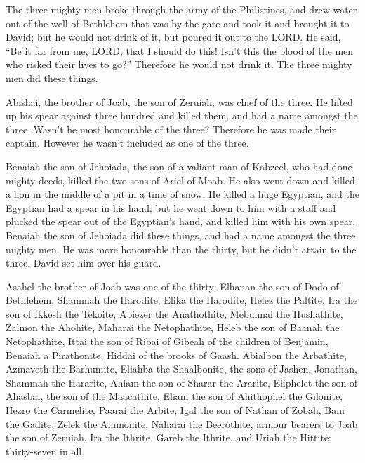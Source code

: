  The three mighty men broke through the army of the
Philistines, and drew water out of the well of Bethlehem that was by the
gate and took it and brought it to David; but he would not drink of it,
but poured it out to the LORD.  He said, ``Be it far from
me, LORD, that I should do this! Isn't this the blood of the men who
risked their lives to go?'' Therefore he would not drink it. The three
mighty men did these things.

 Abishai, the brother of Joab, the son of Zeruiah, was
chief of the three. He lifted up his spear against three hundred and
killed them, and had a name amongst the three.  Wasn't he
most honourable of the three? Therefore he was made their captain.
However he wasn't included as one of the three.

 Benaiah the son of Jehoiada, the son of a valiant man of
Kabzeel, who had done mighty deeds, killed the two sons of Ariel of
Moab. He also went down and killed a lion in the middle of a pit in a
time of snow.  He killed a huge Egyptian, and the
Egyptian had a spear in his hand; but he went down to him with a staff
and plucked the spear out of the Egyptian's hand, and killed him with
his own spear.  Benaiah the son of Jehoiada did these
things, and had a name amongst the three mighty men.  He
was more honourable than the thirty, but he didn't attain to the three.
David set him over his guard.

 Asahel the brother of Joab was one of the thirty:
Elhanan the son of Dodo of Bethlehem,  Shammah the
Harodite, Elika the Harodite,  Helez the Paltite, Ira the
son of Ikkesh the Tekoite,  Abiezer the Anathothite,
Mebunnai the Hushathite,  Zalmon the Ahohite, Maharai the
Netophathite,  Heleb the son of Baanah the Netophathite,
Ittai the son of Ribai of Gibeah of the children of Benjamin,
 Benaiah a Pirathonite, Hiddai of the brooks of Gaash.
 Abialbon the Arbathite, Azmaveth the Barhumite,
 Eliahba the Shaalbonite, the sons of Jashen, Jonathan,
 Shammah the Hararite, Ahiam the son of Sharar the
Ararite,  Eliphelet the son of Ahasbai, the son of the
Maacathite, Eliam the son of Ahithophel the Gilonite, 
Hezro the Carmelite, Paarai the Arbite,  Igal the son of
Nathan of Zobah, Bani the Gadite,  Zelek the Ammonite,
Naharai the Beerothite, armour bearers to Joab the son of Zeruiah,
 Ira the Ithrite, Gareb the Ithrite,  and
Uriah the Hittite: thirty-seven in all.

